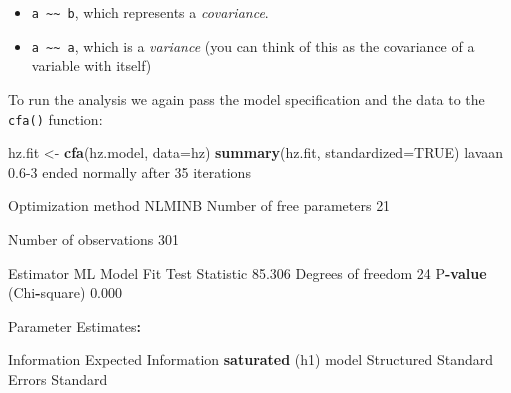 \documentclass[]{article}
\newenvironment{Shaded}{\begin{snugshade}}{\end{snugshade}}
\newcommand{\DataTypeTok}[1]{\textcolor[rgb]{0.13,0.29,0.53}{#1}}
\newcommand{\DecValTok}[1]{\textcolor[rgb]{0.00,0.00,0.81}{#1}}
\newcommand{\FloatTok}[1]{\textcolor[rgb]{0.00,0.00,0.81}{#1}}
\newcommand{\KeywordTok}[1]{\textcolor[rgb]{0.13,0.29,0.53}{\textbf{#1}}}
\newcommand{\NormalTok}[1]{#1}
\newcommand{\OperatorTok}[1]{\textcolor[rgb]{0.81,0.36,0.00}{\textbf{#1}}}
\newcommand{\OtherTok}[1]{\textcolor[rgb]{0.56,0.35,0.01}{#1}}
\newcommand{\StringTok}[1]{\textcolor[rgb]{0.31,0.60,0.02}{#1}}
\begin{document}
\begin{itemize}
\item
  \texttt{a\ \textasciitilde{}\textasciitilde{}\ b}, which represents a \emph{covariance}.
\item
  \texttt{a\ \textasciitilde{}\textasciitilde{}\ a}, which is a \emph{variance} (you can think of this as the covariance of
  a variable with itself)
\end{itemize}

To run the analysis we again pass the model specification and the data to the
\texttt{cfa()} function:

\begin{Shaded}
\begin{Highlighting}[]
\NormalTok{hz.fit <-}\StringTok{ }\KeywordTok{cfa}\NormalTok{(hz.model, }\DataTypeTok{data=}\NormalTok{hz)}
\KeywordTok{summary}\NormalTok{(hz.fit, }\DataTypeTok{standardized=}\OtherTok{TRUE}\NormalTok{)}
\NormalTok{lavaan }\FloatTok{0.6}\DecValTok{-3}\NormalTok{ ended normally after }\DecValTok{35}\NormalTok{ iterations}

\NormalTok{  Optimization method                           NLMINB}
\NormalTok{  Number of free parameters                         }\DecValTok{21}

\NormalTok{  Number of observations                           }\DecValTok{301}

\NormalTok{  Estimator                                         ML}
\NormalTok{  Model Fit Test Statistic                      }\FloatTok{85.306}
\NormalTok{  Degrees of freedom                                }\DecValTok{24}
\NormalTok{  P}\OperatorTok{-}\KeywordTok{value}\NormalTok{ (Chi}\OperatorTok{-}\NormalTok{square)                           }\FloatTok{0.000}

\NormalTok{Parameter Estimates}\OperatorTok{:}

\StringTok{  }\NormalTok{Information                                 Expected}
\NormalTok{  Information }\KeywordTok{saturated}\NormalTok{ (h1) model          Structured}
\NormalTok{  Standard Errors                             Standard}


\end{Highlighting}
\end{Shaded}
\end{document}
